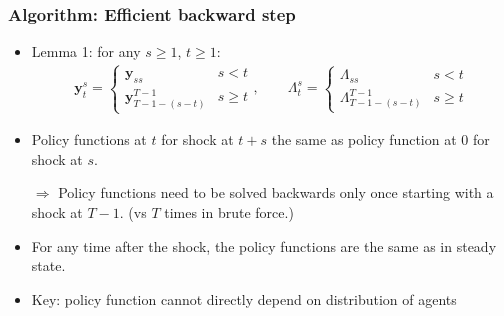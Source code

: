 \documentclass[english,xcolor=svgnames]{beamer}
\begin{document}
\begin{frame}
    \frametitle{Algorithm: Efficient backward step}
    \begin{itemize}
    	\item Lemma 1: for any $s\ge 1$, $t\ge 1$:
    	\begin{align*}
    		\bm{y}_t^s = \begin{cases}
    			\bm{y}_{ss} & s<t \\
    			\bm{y}_{T-1-(s-t)}^{T-1} & s \ge t
    		\end{cases},\qquad  \Lambda_t^s = \begin{cases}
    			 \Lambda_{ss} & s<t \\
    			 \Lambda_{T-1-(s-t)}^{T-1} & s \ge t
    		\end{cases}
    	\end{align*}
    	\item Policy functions at $t$ for shock at $t+s$ the same as policy function at $0$ for shock at $s$. 
        \item[$\Rightarrow$] Policy functions need to be solved backwards only once starting with a shock at $T-1$. (vs $T$ times in brute force.)
%        
        \item For any time after the shock, the policy functions are the same as in steady state.
        \item Key: policy function cannot directly depend on distribution of agents
      \end{itemize}
\end{frame}
\end{document}
